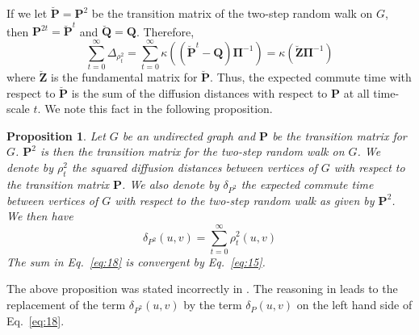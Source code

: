 \documentclass[10pt,twocolumn]{article}
\newtheorem{proposition}[theorem]{Proposition}
\numberwithin{equation}{section}
\begin{document}
If we let $\breve{\mathbf{P}} = \mathbf{P}^{2}$ be the transition matrix
of the two-step random walk on $G$, then $\mathbf{P}^{2t} =
\breve{\mathbf{P}}^{t}$ and $\breve{\mathbf{Q}} =
\mathbf{Q}$. Therefore, 
\begin{equation}
  \label{eq:16}
  \sum_{t = 0}^{\infty} \Delta_{\rho_{t}^{2}} = \sum_{t = 0}^{\infty}
  \kappa((\breve{\mathbf{P}}^{t} - \mathbf{Q})\bm{\Pi}^{-1}) =
  \kappa(\breve{\mathbf{Z}} \bm{\Pi}^{-1})
\end{equation}
where $\breve{\mathbf{Z}}$ is the fundamental matrix for
$\breve{\mathbf{P}}$. Thus, the expected commute time with respect to
$\breve{\mathbf{P}}$ is the
sum of the diffusion distances with respect to $\mathbf{P}$ at all
time-scale $t$. We note this fact in the following proposition.
\begin{proposition}
  \label{prop:7}
  Let $G$ be an undirected graph and $\mathbf{P}$ be
  the transition matrix for $G$. $\mathbf{P}^{2}$ is
  then the transition matrix for the two-step random walk on $G$. We
  denote by $\rho_{t}^{2}$ the squared diffusion distances between
  vertices of $G$ with respect to the transition matrix
  $\mathbf{P}$. We also denote by $\delta_{P^{2}}$ the expected
  commute
  time between vertices of $G$ with respect to the two-step random
  walk as given by $\mathbf{P}^{2}$. We then have
  \begin{equation}
    \label{eq:18}
    \delta_{P^{2}}(u,v) = \sum_{t = 0}^{\infty}{\rho_{t}^{2}(u,v)}
  \end{equation}
  The sum in Eq.~\eqref{eq:18} is convergent by Eq.~\eqref{eq:15}.
\end{proposition}
The above proposition was stated incorrectly in
\cite{qui07:_clust}. The reasoning in \cite{qui07:_clust} leads to
the replacement of the term $\delta_{P^2}(u,v)$ by the term
$\delta_{P}(u,v)$ on the left hand side of Eq.~\eqref{eq:18}.
%
%
%
\end{document}
